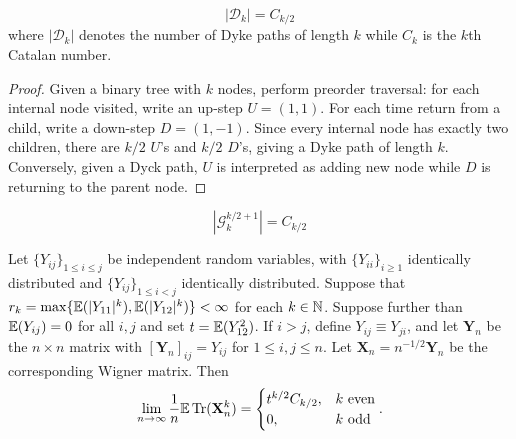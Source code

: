 \begin{proposition}\label{prop:Catalan_Dyck_samecardinality}
  \[|\mathcal{D}_k| = C_{k/2} \] where $|\mathcal{D}_k|$ denotes the number of Dyke paths of length $k$ while
  $C_k$ is the $k$th Catalan number.
  \begin{proof}
    Given a binary tree with $k$ nodes, perform preorder traversal: for each internal node visited, write
    an up-step \(U = (1,1)\). For each time return from a child, write a down-step \(D = (1,-1)\).
    Since every internal node has exactly two children, there are \(k/2\) \(U\)'s and \(k/2\) \(D\)'s,
    giving a Dyke path of length \(k\). Conversely, given a Dyck path, $U$ is interpreted as adding new node
    while $D$ is returning to the parent node.
  \end{proof}
\end{proposition}

\begin{proposition}\label{prop:graph_Catalan_number}
  \[|\mathcal{G}^{k/2 + 1}_k| = C_{k/2}\]
\end{proposition}



%
%
%
%
%
%
%
%


\begin{proposition}
  \label{prop:matrix_moments_convergence}
  \notready
  Let $\{Y_{ij}\}_{1\le i\le j}$ be independent random variables, with $\{Y_{ii}\}_{i\ge 1}$ identically distributed and $\{Y_{ij}\}_{1\le i<j}$ identically distributed.  Suppose that $r_k = \max\{{\mathbb{E}}(|Y_{11}|^k),{\mathbb{E}}(|Y_{12}|^k)\} <\infty$ for each $k\in{\mathbb{N}}$.  Suppose further than ${\mathbb{E}}(Y_{ij})=0$ for all $i,j$ and set $t={\mathbb{E}}(Y_{12}^2)$.  If $i>j$, define $Y_{ij} \equiv Y_{ji}$, and let $\mathbf{Y}_n$ be the $n\times n$ matrix with $[\mathbf{Y}_n]_{ij} = Y_{ij}$ for $1\le i,j\le n$.  Let $\mathbf{X}_n = n^{-1/2}\mathbf{Y}_n$ be the corresponding Wigner matrix.  Then
\[
\lim_{n\to\infty} \frac{1}{n}{\mathbb{E}}\operatorname{Tr}(\mathbf{X}_n^k) = \begin{cases}
  t^{k/2}C_{k/2}, & k\text{ even} \\
  0, & k\text{ odd}
\end{cases}.
\]
\end{proposition}

